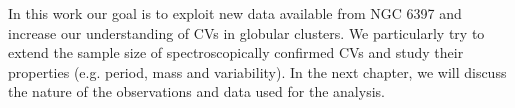 In this work our goal is to exploit new data available from NGC 6397 and increase our understanding of CVs in globular clusters. We particularly try to extend the sample size of spectroscopically confirmed CVs and study their properties (e.g. period, mass and variability). In the next chapter, we will discuss the nature of the observations and data used for the analysis.

